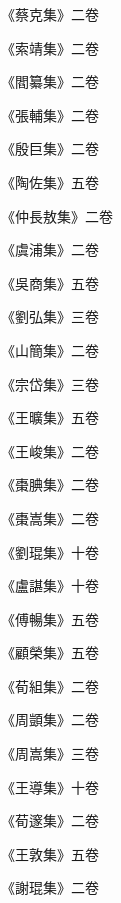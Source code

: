 \begin{pinyinscope}
 《蔡克集》二卷



 《索靖集》二卷



 《閻纂集》二卷



 《張輔集》二卷



 《殷巨集》二卷



 《陶佐集》五卷



 《仲長敖集》二卷



 《虞浦集》二卷



 《吳商集》五卷



 《劉弘集》三卷



 《山簡集》二卷



 《宗岱集》三卷



 《王曠集》五卷



 《王峻集》二卷



 《棗腆集》二卷



 《棗嵩集》二卷



 《劉琨集》十卷



 《盧諶集》十卷



 《傅暢集》五卷



 《顧榮集》五卷



 《荀組集》二卷



 《周顗集》二卷



 《周嵩集》三卷



 《王導集》十卷



 《荀邃集》二卷



 《王敦集》五卷



 《謝琨集》二卷




\end{pinyinscope}
